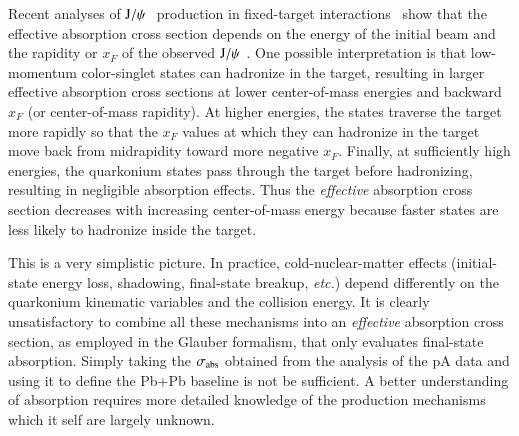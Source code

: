 Recent analyses of $\mathrm{J}/\psi\hspace {0.05in}$ production
in fixed-target interactions~\cite{Lourenco:2008sk} 
show that the effective absorption
cross section depends on the energy of the initial beam and the rapidity or
$x_F$ of the observed $\mathrm{J}/\psi\hspace {0.05in}$.  One possible interpretation is that 
low-momentum color-singlet states can hadronize in the
target, resulting in larger effective absorption cross sections at lower
center-of-mass energies and backward $x_F$ (or center-of-mass rapidity).
At higher energies, the states traverse the target more rapidly so that
the $x_F$ values at which they can hadronize in the target move 
back from midrapidity toward more negative $x_F$.
Finally, at sufficiently high energies, the quarkonium states pass 
through the target before hadronizing, resulting in negligible absorption
effects.  Thus the {\it effective} absorption cross section decreases with 
increasing center-of-mass energy because faster states are less likely 
to hadronize inside the target.

This is a very simplistic picture. In practice, cold-nuclear-matter effects 
(initial-state energy loss, shadowing, final-state breakup, {\it etc.}) 
depend differently on the quarkonium kinematic variables and the collision energy. 
It is clearly unsatisfactory to combine all these mechanisms into an {\it effective} 
absorption cross section, as employed in the Glauber formalism, 
that only evaluates final-state absorption. 
Simply taking the $\sigma_{\rm abs}$ obtained from 
the analysis of the pA data 
and using it to define the Pb+Pb baseline is not be sufficient. 
A better understanding of absorption requires more detailed knowledge of the 
production mechanisms which it self are largely unknown.

